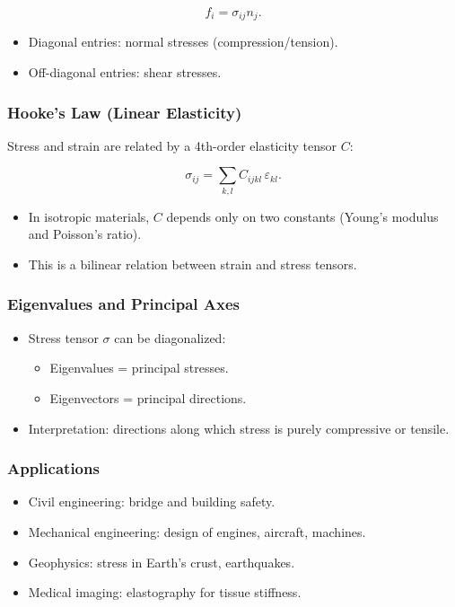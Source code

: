 \documentclass[
  letterpaper,
  DIV=11,
  numbers=noendperiod]{scrreprt}
\providecommand{\tightlist}{%
  \setlength{\itemsep}{0pt}\setlength{\parskip}{0pt}}
\begin{document}
\[
f_i = \sigma_{ij} n_j.
\]

\begin{itemize}
\tightlist
\item
  Diagonal entries: normal stresses (compression/tension).
\item
  Off-diagonal entries: shear stresses.
\end{itemize}

\subsubsection{Hooke's Law (Linear
Elasticity)}\label{hookes-law-linear-elasticity}

Stress and strain are related by a 4th-order elasticity tensor \(C\):

\[
\sigma_{ij} = \sum_{k,l} C_{ijkl} \, \varepsilon_{kl}.
\]

\begin{itemize}
\tightlist
\item
  In isotropic materials, \(C\) depends only on two constants (Young's
  modulus and Poisson's ratio).
\item
  This is a bilinear relation between strain and stress tensors.
\end{itemize}

\subsubsection{Eigenvalues and Principal
Axes}\label{eigenvalues-and-principal-axes}

\begin{itemize}
\item
  Stress tensor \(\sigma\) can be diagonalized:

  \begin{itemize}
  \tightlist
  \item
    Eigenvalues = principal stresses.
  \item
    Eigenvectors = principal directions.
  \end{itemize}
\item
  Interpretation: directions along which stress is purely compressive or
  tensile.
\end{itemize}

\subsubsection{Applications}\label{applications-8}

\begin{itemize}
\tightlist
\item
  Civil engineering: bridge and building safety.
\item
  Mechanical engineering: design of engines, aircraft, machines.
\item
  Geophysics: stress in Earth's crust, earthquakes.
\item
  Medical imaging: elastography for tissue stiffness.
\end{itemize}
\end{document}
